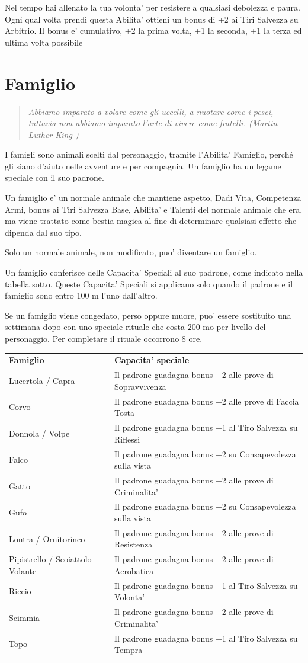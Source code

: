 \documentclass[a4paper,11pt,twoside,openany]{book}
\begin{document}
Nel tempo hai allenato la tua volonta' per resistere a qualsiasi debolezza e paura. Ogni qual volta prendi questa Abilita' ottieni un bonus di +2 ai Tiri Salvezza su Arbitrio. Il bonus e' cumulativo, +2 la prima volta, +1 la seconda, +1 la terza ed ultima volta possibile

\pagebreak

\section{Famiglio}

\label{famiglio}
\begin{quote}\textit{
Abbiamo imparato a volare come gli uccelli, a nuotare come i pesci, tuttavia non abbiamo imparato l'arte di vivere come fratelli. (Martin Luther King )
}\end{quote}

I famigli sono animali scelti dal personaggio, tramite l'Abilita' Famiglio, perché gli siano d'aiuto nelle avventure e per compagnia. Un famiglio ha un legame speciale con il suo padrone.

Un famiglio e' un normale animale che mantiene aspetto, Dadi Vita, Competenza Armi, bonus ai Tiri Salvezza Base, Abilita' e Talenti del normale animale che era, ma viene trattato come bestia magica al fine di determinare qualsiasi effetto che dipenda dal suo tipo. 

Solo un normale animale, non modificato, puo' diventare un famiglio.

Un famiglio conferisce delle Capacita' Speciali al suo padrone, come indicato nella tabella sotto. Queste Capacita' Speciali si applicano solo quando il padrone e il famiglio sono entro 100 m l'uno dall'altro.

Se un famiglio viene congedato, perso oppure muore, puo' essere sostituito una settimana dopo con uno speciale rituale che costa 200 mo per livello del personaggio. Per {\small completare} il rituale occorrono 8 ore.

\bigskip

\begin{tabular}{L{4.5cm} L{11.5cm}}
\toprule
\textbf{Famiglio} & \textbf{Capacita' speciale}\tabularnewline
Lucertola / Capra & Il padrone guadagna bonus +2 alle prove di Sopravvivenza\tabularnewline
Corvo & Il padrone guadagna bonus +2 alle prove di Faccia Tosta\tabularnewline
Donnola / Volpe & Il padrone guadagna bonus +1 al Tiro Salvezza su Riflessi\tabularnewline
Falco & Il padrone guadagna bonus +2 su Consapevolezza sulla vista\tabularnewline
Gatto & Il padrone guadagna bonus +2 alle prove di Criminalita'\tabularnewline
Gufo & Il padrone guadagna bonus +2 su Consapevolezza sulla vista\tabularnewline
Lontra / Ornitorinco & Il padrone guadagna bonus +2 alle prove di Resistenza\tabularnewline
Pipistrello / Scoiattolo Volante & Il padrone guadagna bonus +2 alle prove di Acrobatica\tabularnewline
Riccio & Il padrone guadagna bonus +1 al Tiro Salvezza su Volonta'\tabularnewline
Scimmia & Il padrone guadagna bonus +2 alle prove di Criminalita'\tabularnewline
Topo & Il padrone guadagna bonus +1 al Tiro Salvezza su Tempra\tabularnewline
\end{tabular}
\end{document}
